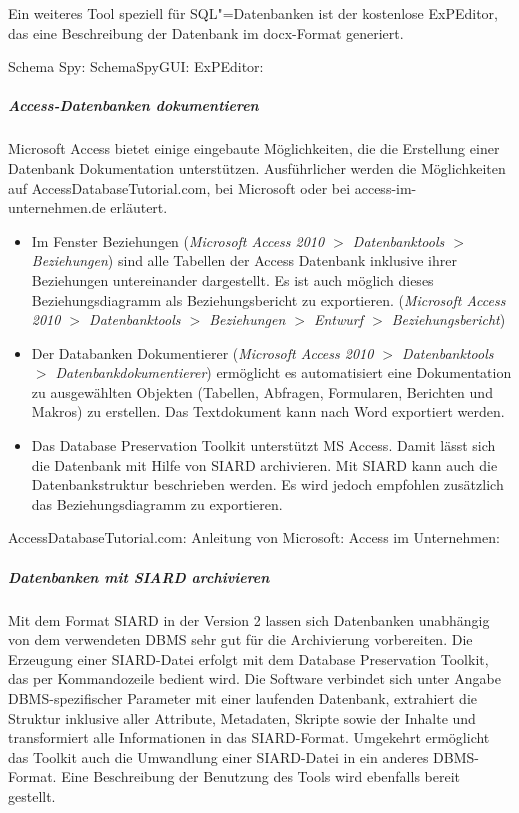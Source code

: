 Ein weiteres Tool speziell für SQL"=Datenbanken ist der kostenlose ExPEditor, das eine Beschreibung der Datenbank im docx-Format generiert.

\begin{flushleft}
Schema Spy: 
SchemaSpyGUI: 
ExPEditor: 
\end{flushleft}

\subparagraph{Access-Datenbanken dokumentieren}
Microsoft Access bietet einige eingebaute Möglichkeiten, die die Erstellung einer Datenbank Dokumentation unterstützen. Ausführlicher werden die Möglichkeiten auf AccessDatabaseTutorial.com, bei Microsoft oder bei access-im-unternehmen.de erläutert.
\begin{itemize}
	\item Im Fenster Beziehungen (\emph{Microsoft Access 2010 $>$ Datenbanktools $>$ Beziehungen}) sind alle Tabellen der Access Datenbank inklusive ihrer Beziehungen untereinander dargestellt. Es ist auch möglich dieses Beziehungsdiagramm als Beziehungsbericht zu exportieren. (\emph{Microsoft Access 2010 $>$ Datenbanktools $>$ Beziehungen $>$ Entwurf $>$ Beziehungsbericht})
	\item Der Databanken Dokumentierer (\emph{Microsoft Access 2010 $>$ Datenbanktools $>$ Datenbankdokumentierer}) ermöglicht es automatisiert eine Dokumentation zu ausgewählten Objekten (Tabellen, Abfragen, Formularen, Berichten und Makros) zu erstellen. Das Textdokument kann nach Word exportiert werden.
	\item Das Database Preservation Toolkit unterstützt MS Access. Damit lässt sich die Datenbank mit Hilfe von SIARD archivieren. Mit SIARD kann auch die Datenbankstruktur beschrieben werden. Es wird jedoch empfohlen zusätzlich das Beziehungsdiagramm zu exportieren.
\end{itemize}

\begin{flushleft}
AccessDatabaseTutorial.com: 
Anleitung von Microsoft: 
Access im Unternehmen: 
\end{flushleft}

\subparagraph{Datenbanken mit SIARD archivieren}
Mit dem Format SIARD in der Version 2 lassen sich Datenbanken unabhängig von dem verwendeten DBMS sehr gut für die Archivierung vorbereiten. Die Erzeugung einer SIARD-Datei erfolgt mit dem Database Preservation Toolkit, das per Kommandozeile bedient wird. Die Software verbindet sich unter Angabe DBMS-spezifischer Parameter mit einer laufenden Datenbank, extrahiert die Struktur inklusive aller Attribute, Metadaten, Skripte sowie der Inhalte und transformiert alle Informationen in das SIARD-Format. Umgekehrt ermöglicht das Toolkit auch die Umwandlung einer SIARD-Datei in ein anderes DBMS-Format. Eine Beschreibung der Benutzung des Tools wird ebenfalls bereit gestellt.

